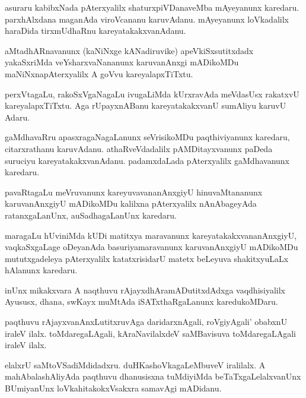 \documentclass{article}
\begin{document}
\begin{mn}%
asuraru kabibxNada pAterxyalilx shaturxpiVDanaveMba mAyeyanunx
karedaru. parxhAlxdana maganAda viroVcananu karuvAdanu. mAyeyanunx
loVkadalilx haraDida tirxmUdhaRnu kareyatakakxvanAdanu.
\end{mn}

\begin{mn}
aMtadhARnavanunx (kaNiNxge kANadiruvike) apeVkiSxsutitxdadx
yakaSxriMda veYsharxvaNananunx karuvanAnxgi mADikoMDu
maNiNxnapAterxyalilx A goVvu kareyalapxTiTxtu.
\end{mn}

\begin{mn}
perxVtagaLu, rakoSxVgaNagaLu ivugaLiMda kUrxravAda meVdasUsx rakatxvU
kareyalapxTiTxtu. Aga rUpayxnABanu kareyatakakxvanU sumAliyu karuvU Adaru.
\end{mn}

\begin{mn}%
gaMdhavaRru apasxragaNagaLanunx seVrisikoMDu paqthiviyanunx karedaru,
citarxrathanu karuvAdanu. athaRveVdadalilx pAMDitayxvanunx paDeda
suruciyu kareyatakakxvanAdanu. padamxdaLada pAterxyalilx gaMdhavanunx karedaru.
\end{mn}

\begin{mn}
pavaRtagaLu meVruvanunx kareyuvavananAnxgiyU hinuvaMtananunx
karuvanAnxgiyU mADikoMDu kalilxna pAterxyalilx nAnAbageyAda
ratanxgaLanUnx, auSadhagaLanUnx karedaru.
\end{mn}

\begin{mn}%
maragaLu hUviniMda kUDi matitxya maravanunx kareyatakakxvananAnxgiyU,
vaqkaSxgaLage oDeyanAda basuriyamaravanunx karuvanAnxgiyU mADikoMDu
mututxgadeleya pAterxyalilx katatxrisidarU matetx beLeyuva
shakitxyuLaLx hAlanunx karedaru.
\end{mn}

\begin{mn}
inUnx mikakxvara A naqthuvu rAjayxdhAramADutitxdAdxga vaqdhisiyalilx
Ayususx, dhana, swKayx muMtAda iSATxthaRgaLanunx karedukoMDaru.
\end{mn}

\begin{mn}%
paqthuvu rAjayxvanAnxLutitxruvAga daridarxnAgali, roVgiyAgali' obabxnU
iraleV ilalx. toMdaregaLAgali, kAraNavilalxdeV saMBavisuva
toMdaregaLAgali iraleV ilalx.
\end{mn}

\begin{mn}
elalxrU saMtoVSadiMdidadxru. duHKashoVkagaLeMbuveV iralilalx. A
mahAbalashAliyAda paqthuvu dhanusisxna tuMdiyiMda beTaTxgaLelalxvanUnx
BUmiyanUnx loVkahitakokxVsakxra samavAgi mADidanu.
\end{mn}
\end{document}
